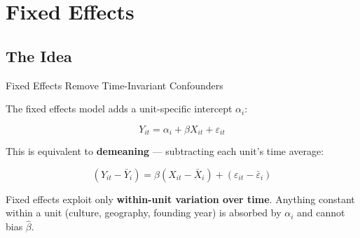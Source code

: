 \documentclass[9pt,aspectratio=169]{beamer}
\begin{document}
\section{Fixed Effects}
\subsection{The Idea}

\begin{frame}{Fixed Effects Remove Time-Invariant Confounders}

The fixed effects model adds a \alert{unit-specific intercept} $\alpha_i$:

$$Y_{it} = \alpha_i + \beta X_{it} + \varepsilon_{it}$$

\medskip

This is equivalent to \textbf{demeaning} --- subtracting each unit's time average:

$$(Y_{it} - \bar{Y}_i) = \beta (X_{it} - \bar{X}_i) + (\varepsilon_{it} - \bar{\varepsilon}_i)$$

\bigskip

\begin{highlightbox}
\centering
Fixed effects exploit only \textbf{within-unit variation over time}. Anything constant within a unit (culture, geography, founding year) is absorbed by $\alpha_i$ and cannot bias $\hat{\beta}$.
\end{highlightbox}

\end{frame}
\end{document}
